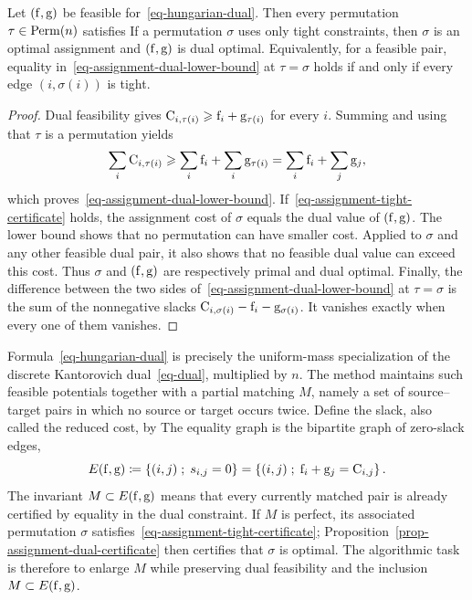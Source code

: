 \begin{prop}\label{prop-assignment-dual-certificate}
	Let $(\mathrm{f},\mathrm{g})$ be feasible for~\eqref{eq-hungarian-dual}. Then every permutation $\tau\in\mathrm{Perm}(n)$ satisfies
	If a permutation $\sigma$ uses only tight constraints,
	then $\sigma$ is an optimal assignment and $(\mathrm{f},\mathrm{g})$ is dual optimal. Equivalently, for a feasible pair, equality in~\eqref{eq-assignment-dual-lower-bound} at $\tau=\sigma$ holds if and only if every edge $(i,\sigma(i))$ is tight.
\end{prop}
\begin{proof}
	Dual feasibility gives $\mathrm{C}_{i,\tau(i)}\geqslant\mathrm{f}_i+\mathrm{g}_{\tau(i)}$ for every $i$. Summing and using that $\tau$ is a permutation yields
	\[
		\sum_i\mathrm{C}_{i,\tau(i)}
		\geqslant
		\sum_i\mathrm{f}_i+\sum_i\mathrm{g}_{\tau(i)}
		=
		\sum_i\mathrm{f}_i+\sum_j\mathrm{g}_j,
	\]
	which proves~\eqref{eq-assignment-dual-lower-bound}. If~\eqref{eq-assignment-tight-certificate} holds, the assignment cost of $\sigma$ equals the dual value of $(\mathrm{f},\mathrm{g})$. The lower bound shows that no permutation can have smaller cost. Applied to $\sigma$ and any other feasible dual pair, it also shows that no feasible dual value can exceed this cost. Thus $\sigma$ and $(\mathrm{f},\mathrm{g})$ are respectively primal and dual optimal. Finally, the difference between the two sides of~\eqref{eq-assignment-dual-lower-bound} at $\tau=\sigma$ is the sum of the nonnegative slacks $\mathrm{C}_{i,\sigma(i)}-\mathrm{f}_i-\mathrm{g}_{\sigma(i)}$. It vanishes exactly when every one of them vanishes.
\end{proof}

Formula~\eqref{eq-hungarian-dual} is precisely the uniform-mass specialization of the discrete Kantorovich dual~\eqref{eq-dual}, multiplied by $n$.
%
The method maintains such feasible potentials together with a partial matching $M$, namely a set of source--target pairs in which no source or target occurs twice. Define the slack, also called the reduced cost, by
The equality graph is the bipartite graph of zero-slack edges,
\[
	E(\mathrm{f},\mathrm{g})
	\coloneqq
	\left\{ (i,j) \;;\; s_{i,j}=0 \right\}
	=
	\left\{ (i,j) \;;\; \mathrm{f}_i+\mathrm{g}_j=\mathrm{C}_{i,j} \right\}.
\]
The invariant $M\subset E(\mathrm{f},\mathrm{g})$ means that every currently matched pair is already certified by equality in the dual constraint. If $M$ is perfect, its associated permutation $\sigma$ satisfies~\eqref{eq-assignment-tight-certificate}; Proposition~\ref{prop-assignment-dual-certificate} then certifies that $\sigma$ is optimal. The algorithmic task is therefore to enlarge $M$ while preserving dual feasibility and the inclusion $M\subset E(\mathrm{f},\mathrm{g})$.


